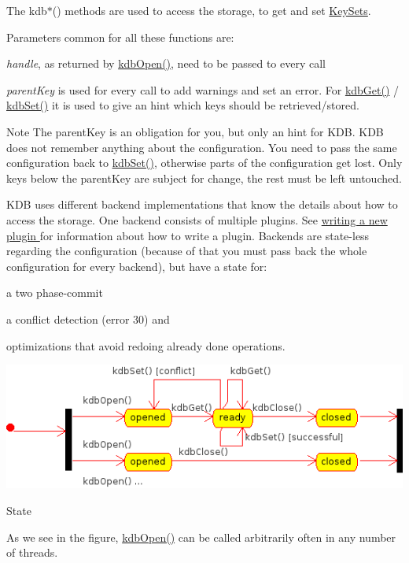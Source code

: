 The kdb$\ast$() methods are used to access the storage, to get and set \hyperlink{group__keyset}{Key\+Sets}.

Parameters common for all these functions are\+:


\begin{DoxyItemize}
\item {\itshape handle}, as returned by \hyperlink{group__kdb_ga6808defe5870f328dd17910aacbdc6ca}{kdb\+Open()}, need to be passed to every call
\item {\itshape parent\+Key} is used for every call to add warnings and set an error. For \hyperlink{group__kdb_ga28e385fd9cb7ccfe0b2f1ed2f62453a1}{kdb\+Get()} / \hyperlink{group__kdb_ga11436b058408f83d303ca5e996832bcf}{kdb\+Set()} it is used to give an hint which keys should be retrieved/stored.
\end{DoxyItemize}

\begin{DoxyNote}{Note}
The parent\+Key is an obligation for you, but only an hint for K\+D\+B. K\+D\+B does not remember anything about the configuration. You need to pass the same configuration back to \hyperlink{group__kdb_ga11436b058408f83d303ca5e996832bcf}{kdb\+Set()}, otherwise parts of the configuration get lost. Only keys below the parent\+Key are subject for change, the rest must be left untouched.
\end{DoxyNote}
K\+D\+B uses different backend implementations that know the details about how to access the storage. One backend consists of multiple plugins. See \hyperlink{group__plugin}{writing a new plugin } for information about how to write a plugin. Backends are state-\/less regarding the configuration (because of that you must pass back the whole configuration for every backend), but have a state for\+:


\begin{DoxyItemize}
\item a two phase-\/commit
\item a conflict detection (error 30) and
\item optimizations that avoid redoing already done operations.
\end{DoxyItemize}


\begin{DoxyImage}
\includegraphics{state.png}
\caption{State}
\end{DoxyImage}
 As we see in the figure, \hyperlink{group__kdb_ga6808defe5870f328dd17910aacbdc6ca}{kdb\+Open()} can be called arbitrarily often in any number of threads.

